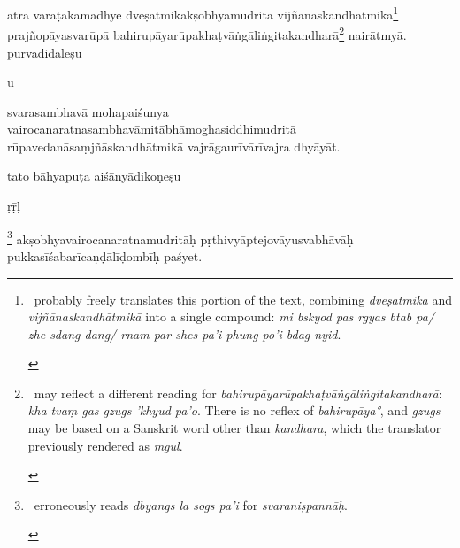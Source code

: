 \documentclass[naipra.tex]{subfiles}
\begin{document}
\begin{sanskrit}
\pstart
atra varaṭakamadhye   dveṣātmikākṣobhyamudritā vijñānaskandhātmikā\footnote{
	\begin{english}%
		\TIB\ probably freely translates this portion of the text, combining \emph{dveṣātmikā} and \emph{vijñānaskandhātmikā} into a single compound: \emph{mi bskyod pas rgyas btab pa/ zhe sdang dang/ rnam par shes pa'i phung po'i bdag nyid}. 
	\end{english}
} prajñopāyasvarūpā bahirupāyarūpakhaṭvāṅgāliṅgitakandharā\footnote{
	\begin{english}%
		\TIB\ may reflect a different reading for \emph{bahirupāyarūpakhaṭvāṅgāliṅgitakandharā}: \emph{kha tvaṃ gas gzugs 'khyud pa'o}.
		There is no reflex of \emph{bahirupāya°}, and \emph{gzugs} may be based on a Sanskrit word other than \emph{kandhara}, which the translator previously rendered as \emph{mgul}.
	\end{english}
} nairātmyā.
pūrvādidaleṣu \begin{mantra}\dsh u\end{mantra}\dsh svarasambhavā mohapaiśunya vairocanaratnasambhavāmitābhāmoghasiddhimudritā rūpavedanāsaṃjñāskandhātmikā vajrāgaurīvārīvajra dhyāyāt. 
\pend



\pstart
tato bāhyapuṭa aiśānyādikoṇeṣu \begin{mantra}\dsh ṛ\dsh ṝ\dsh ḷ\end{mantra}\dsh {}\footnote{
	\begin{english}%
		\TIB\ erroneously reads \emph{dbyangs la sogs pa'i} for \emph{svaraniṣpannāḥ}. 
	\end{english}
} akṣobhyavairocanaratnamudritāḥ pṛthivyāptejovāyusvabhāvāḥ pukkasīśabarīcaṇḍālīḍombīḥ paśyet. 
\pend


\end{sanskrit}
\end{document}
